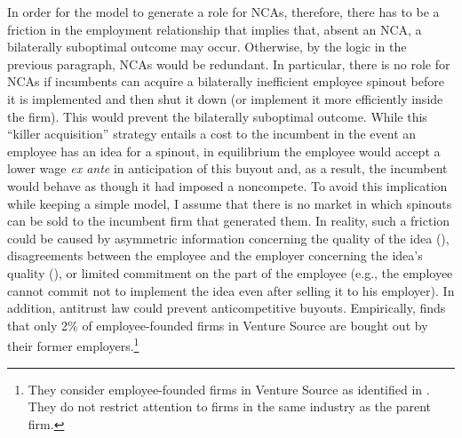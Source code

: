 \documentclass[ecta,nameyear,final]{econsocart}
\theoremstyle{plain}
\theoremstyle{remark}
\begin{document}
In order for the model to generate a role for NCAs, therefore, there has to be a friction in the employment relationship that implies that, absent an NCA, a bilaterally suboptimal outcome may occur. Otherwise, by the logic in the previous paragraph, NCAs would be redundant. In particular, there is no role for NCAs if incumbents can acquire a bilaterally inefficient employee spinout before it is implemented and then shut it down (or implement it more efficiently inside the firm). This would prevent the bilaterally suboptimal outcome. While this ``killer acquisition'' strategy entails a cost to the incumbent in the event an employee has an idea for a spinout, in equilibrium the employee would accept a lower wage \textit{ex ante} in anticipation of this buyout and, as a result, the incumbent would behave as though it had imposed a noncompete. To avoid this implication while keeping a simple model, I assume that there is no market in which spinouts can be sold to the incumbent firm that generated them. In reality, such a friction could be caused by asymmetric information concerning the quality of the idea (\cite{chatterjee_spinoffs_2012}), disagreements between the employee and the employer concerning the idea's quality (\cite{klepper_disagreements_2007}), or limited commitment on the part of the employee (e.g., the employee cannot commit not to implement the idea even after selling it to his employer). In addition, antitrust law could prevent anticompetitive buyouts. Empirically, \cite{babina_entrepreneurial_2019} finds that only 2\% of employee-founded firms in Venture Source are bought out by their former employers.\footnote{They consider employee-founded firms in Venture Source as identified in \cite{gompers_entrepreneurial_2005}. They do not restrict attention to firms in the same industry as the parent firm.}
\end{document}
